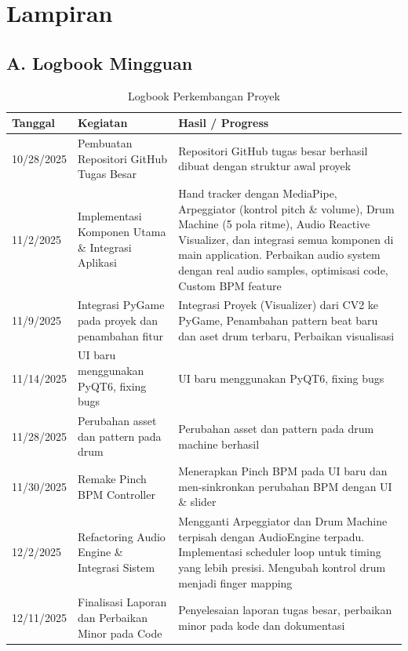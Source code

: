 \section*{Lampiran}

\subsection*{A. Logbook Mingguan}

\begin{table}[H]
\centering
\caption{Logbook Perkembangan Proyek}
\label{tab:logbook}
\small
\begin{tabular}{p{2.5cm}p{5cm}p{6cm}}
\hline
\textbf{Tanggal} & \textbf{Kegiatan} & \textbf{Hasil / Progress} \\ \hline
10/28/2025 & Pembuatan Repositori GitHub Tugas Besar & Repositori GitHub tugas besar berhasil dibuat dengan struktur awal proyek \\ \hline
11/2/2025 & Implementasi Komponen Utama \& Integrasi Aplikasi & Hand tracker dengan MediaPipe, Arpeggiator (kontrol pitch \& volume), Drum Machine (5 pola ritme), Audio Reactive Visualizer, dan integrasi semua komponen di main application. Perbaikan audio system dengan real audio samples, optimisasi code, Custom BPM feature \\ \hline
11/9/2025 & Integrasi PyGame pada proyek dan penambahan fitur & Integrasi Proyek (Visualizer) dari CV2 ke PyGame, Penambahan pattern beat baru dan aset drum terbaru, Perbaikan visualisasi \\ \hline
11/14/2025 & UI baru menggunakan PyQT6, fixing bugs & UI baru menggunakan PyQT6, fixing bugs \\ \hline
11/28/2025 & Perubahan asset dan pattern pada drum & Perubahan asset dan pattern pada drum machine berhasil \\ \hline
11/30/2025 & Remake Pinch BPM Controller & Menerapkan Pinch BPM pada UI baru dan men-sinkronkan perubahan BPM dengan UI \& slider \\ \hline
12/2/2025 & Refactoring Audio Engine \& Integrasi Sistem & Mengganti Arpeggiator dan Drum Machine terpisah dengan AudioEngine terpadu. Implementasi scheduler loop untuk timing yang lebih presisi. Mengubah kontrol drum menjadi finger mapping \\ \hline
12/11/2025 & Finalisasi Laporan dan Perbaikan Minor pada Code & Penyelesaian laporan tugas besar, perbaikan minor pada kode dan dokumentasi \\ \hline
\end{tabular}
\end{table}

